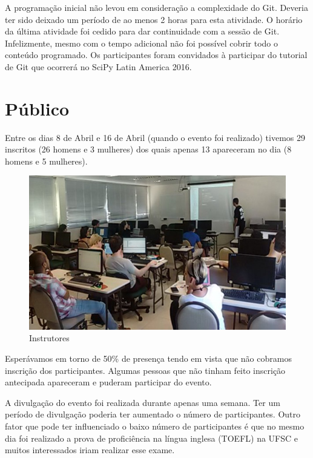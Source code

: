 \documentclass[12pt]{article}
\begin{document}
A programação inicial não levou em consideração a complexidade do  Git.
Deveria ter sido deixado um período de ao menos 2 horas para esta atividade.
O horário da última atividade foi cedido para dar continuidade com a sessão de
Git. Infelizmente, mesmo com o tempo adicional não foi possível cobrir todo o
conteúdo programado. Os participantes foram convidados à participar do tutorial
de Git que ocorrerá no SciPy Latin America 2016.

\newpage

\section*{Público}

Entre os dias 8 de Abril e 16 de Abril (quando o evento foi realizado)
tivemos 29 inscritos (26 homens e 3 mulheres) dos quais apenas 13 apareceram no
dia (8 homens e 5 mulheres).

\begin{figure}[!htb]
\includegraphics[width=\textwidth]{../../media/photos/pre0-cut}
\caption{Instrutores}
\end{figure}

Esperávamos em torno de 50\% de presença tendo em vista que não cobramos
inscrição dos participantes.
Algumas pessoas que não tinham feito inscrição antecipada apareceram e puderam
participar do evento.

A divulgação do evento foi realizada durante apenas uma semana.
Ter um período de divulgação poderia ter aumentado o número de participantes.
Outro fator que pode ter influenciado o baixo número de participantes é que no
mesmo dia foi realizado a prova de proficiência na língua inglesa
(TOEFL) na UFSC e muitos interessados iriam realizar esse exame.
\newpage
\end{document}
